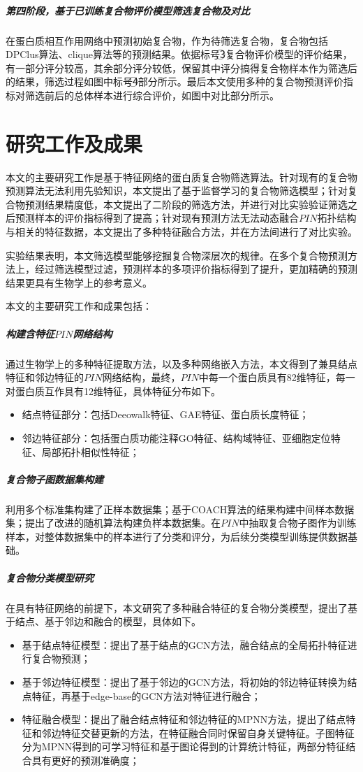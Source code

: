 \subparagraph*{第四阶段，基于已训练复合物评价模型筛选复合物及对比}

在蛋白质相互作用网络中预测初始复合物，作为待筛选复合物，复合物包括DPClus算法、clique算法等的预测结果。依据标号\textcircled{3}复合物评价模型的评价结果，有一部分评分较高，其余部分评分较低，保留其中评分搞得复合物样本作为筛选后的结果，筛选过程如图中标号\textcircled{4}部分所示。最后本文使用多种的复合物预测评价指标对筛选前后的总体样本进行综合评价，如图中对比部分所示。

\section{研究工作及成果}
\label{section:intro:workandresult}

本文的主要研究工作是基于特征网络的蛋白质复合物筛选算法。针对现有的复合物预测算法无法利用先验知识，本文提出了基于监督学习的复合物筛选模型；针对复合物预测结果精度低，本文提出了二阶段的筛选方法，并进行对比实验验证筛选之后预测样本的评价指标得到了提高；针对现有预测方法无法动态融合$PIN$拓扑结构与相关的特征数据，本文提出了多种特征融合方法，并在方法间进行了对比实验。

实验结果表明，本文筛选模型能够挖掘复合物深层次的规律。在多个复合物预测方法上，经过筛选模型过滤，预测样本的多项评价指标得到了提升，更加精确的预测结果更具有生物学上的参考意义。

本文的主要研究工作和成果包括：

\subparagraph*{构建含特征$PIN$网络结构}

通过生物学上的多种特征提取方法，以及多种网络嵌入方法，本文得到了兼具结点特征和邻边特征的$PIN$网络结构，最终，$PIN$中每一个蛋白质具有82维特征，每一对蛋白质互作具有12维特征，具体特征分布如下。
\begin{itemize}
  \item 结点特征部分：包括Deeowalk特征、GAE特征、蛋白质长度特征；
  \item 邻边特征部分：包括蛋白质功能注释GO特征、结构域特征、亚细胞定位特征、局部拓扑相似性特征；
\end{itemize}

\subparagraph*{复合物子图数据集构建}

利用多个标准集构建了正样本数据集；基于COACH算法的结果构建中间样本数据集；提出了改进的随机算法构建负样本数据集。在$PIN$中抽取复合物子图作为训练样本，对整体数据集中的样本进行了分类和评分，为后续分类模型训练提供数据基础。

\subparagraph*{复合物分类模型研究}

在具有特征网络的前提下，本文研究了多种融合特征的复合物分类模型，提出了基于结点、基于邻边和融合的模型，具体如下。
\begin{itemize}
  \item 基于结点特征模型：提出了基于结点的GCN方法，融合结点的全局拓扑特征进行复合物预测；
  \item 基于邻边特征模型：提出了基于邻边的GCN方法，将初始的邻边特征转换为结点特征，再基于edge-base的GCN方法对特征进行融合；
  \item 特征融合模型：提出了融合结点特征和邻边特征的MPNN方法，提出了结点特征和邻边特征交替更新的方法，在特征融合同时保留自身关键特征。子图特征分为MPNN得到的可学习特征和基于图论得到的计算统计特征，两部分特征结合具有更好的预测准确度；
\end{itemize}

